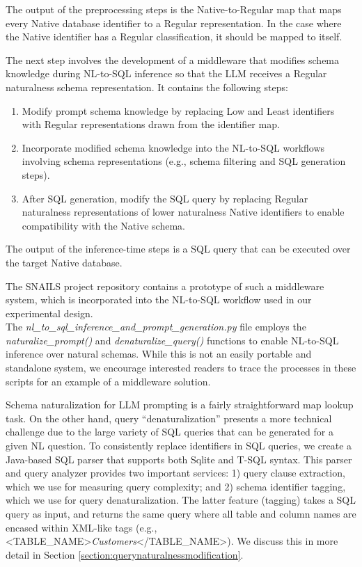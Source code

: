 The output of the preprocessing steps is the Native-to-Regular map that maps every Native  database identifier to a Regular representation.
In the case where the Native identifier has a Regular classification, it should be mapped to itself.

The next step involves the development of a middleware that modifies schema knowledge during NL-to-SQL inference so that the LLM receives a Regular naturalness schema representation.
It contains the following steps:
\begin{enumerate}
  \item Modify prompt schema knowledge by replacing Low and Least identifiers with Regular representations drawn from the identifier map.
  \item Incorporate modified schema knowledge into the NL-to-SQL workflows involving schema representations (e.g., schema filtering and SQL generation steps).
  \item After SQL generation, modify the SQL query by replacing Regular naturalness representations of lower naturalness Native identifiers to enable compatibility with the Native schema.
\end{enumerate}

The output of the inference-time steps is a SQL query that can be executed over the target Native database.

The SNAILS project repository contains a prototype of such a middleware system, which is incorporated into the NL-to-SQL workflow used in our experimental design.
\\The \emph{nl\_to\_sql\_inference\_and\_prompt\_generation.py} file employs the \emph{naturalize\_prompt()} and \emph{denaturalize\_query()} functions to enable NL-to-SQL inference over natural schemas.
While this is not an easily portable and standalone system, we encourage interested readers to trace the processes in these scripts for an example of a middleware solution.

Schema naturalization for LLM prompting is a fairly straightforward map lookup task. 
On the other hand, query ``denaturalization'' presents a more technical challenge due to the large variety of SQL queries that can be generated for a given NL question.
To consistently replace identifiers in SQL queries, we create a Java-based SQL parser that supports both Sqlite and T-SQL syntax.
This parser and query analyzer provides two important services: 1) query clause extraction, which we use for measuring query complexity; and 2) schema identifier tagging, which we use for query denaturalization.
The latter feature (tagging) takes a SQL query as input, and returns the same query where all table and column names are encased within XML-like tags (e.g., <TABLE\_NAME>\emph{Customers}</TABLE\_NAME>).
We discuss this in more detail in Section \ref{section:querynaturalnessmodification}.

